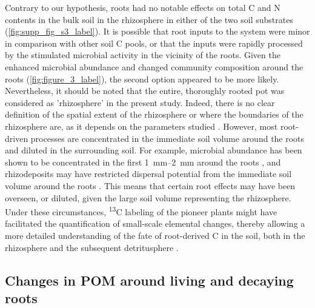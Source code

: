 Contrary to our hypothesis, roots had no notable effects on total C and N contents in the bulk soil in the rhizosphere in either of the two soil substrates (\cref{fig:supp_fig_s3_label}). It is possible that root inputs to the system were minor in comparison with other soil C pools, or that the inputs were rapidly processed by the stimulated microbial activity in the vicinity of the roots. Given the enhanced microbial abundance and changed community composition around the roots (\cref{fig:figure_3_label}), the second option appeared to be more likely. Nevertheless, it should be noted that the entire, thoroughly rooted pot was considered as 'rhizosphere' in the present study. Indeed, there is no clear definition of the spatial extent of the rhizosphere or where the boundaries of the rhizosphere are, as it depends on the parameters studied \citep{Kuzyakov2019}. However, most root-driven processes are concentrated in the immediate soil volume around the roots and diluted in the surrounding soil. For example, microbial abundance has been shown to be concentrated in the first \SIrange{1}{2}{\milli\metre} around the roots \citep{Marschner2012}, and rhizodeposits may have restricted dispersal potential from the immediate soil volume around the roots \citep{Kuzyakov2019}. This means that certain root effects may have been overseen, or diluted, given the large soil volume representing the rhizosphere. Under these circumstances, \textsuperscript{13}C labeling of the pioneer plants might have facilitated the quantification of small-scale elemental changes, thereby allowing a more detailed understanding of the fate of root-derived C in the soil, both in the rhizosphere and the subsequent detritusphere \citep{Teixeira2024}.

\subsection{Changes in POM around living and decaying roots}

